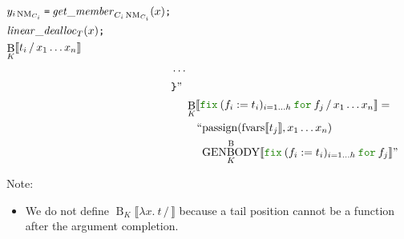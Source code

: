 \documentclass[a4paper,fleqn]{article}
\newcommand{\kwfix}{\mbox{\color{mygreen}\ttfamily fix}}
\newcommand{\kwfor}{\mbox{\color{mygreen}\ttfamily for}}
\newcommand{\lam}[2]{\lambda #1.\:#2}
\newcommand{\fix}[4]{\kwfix\:(#1 := #2)_{#3}\:\kwfor\:#4}
\DeclareMathOperator{\NM}{NM}
\newcommand{\BRA}[1]{\llbracket #1 \rrbracket}
\DeclareMathOperator{\genbody}{GENBODY}
\newcommand{\genbodyb}[2]{\genbody^\mathrm{B}_{#1}\BRA{#2}}
\newcommand{\ldq}{\text{``}}
\newcommand{\rdq}{\text{''}}
\newcommand{\ttrbrace}{\texttt{\char '175}}
\newcommand{\tteq}{\texttt{=}}
\newcommand{\ttsemi}{\texttt{;}}
\DeclareMathOperator{\passign}{passign}
\DeclareMathOperator{\fvarsop}{fvars}
\newcommand{\fvars}[1]{\fvarsop\BRA{#1}}
\DeclareMathOperator{\Bop}{B}
\newcommand{\B}[3]{\Bop_{#1}\BRA{#2\,/\,#3}}
\begin{document}
\begin{align*}
\begin{alignedat}{2}
\begin{aligned}[t]
                & y_{i\NM_{C_i}}\:\tteq\:\mathit{get\_member}_{C_i\NM_{C_i}}(x)\ttsemi \\
                & \mathit{linear\_dealloc}_{T}(x)\ttsemi \\
                & {\B{K}{t_i}{x_1\ldots x_n}}
              \end{aligned} \\
            & \cdots \\
            & \ttrbrace\rdq
     \end{alignedat} \\
  &\B{K}{\fix{f_i}{t_i}{i=1\ldots h}{f_j}}{x_1\ldots x_n} =       \\
     & \quad\begin{alignedat}{2}
       \ldq & {\passign(\fvars{t_j}, x_1\ldots x_n)} \\
            & {\genbodyb{K}{\fix{f_i}{t_i}{i=1\ldots h}{f_j}}} \rdq
       \end{alignedat}
\end{align*}
{\small Note:
\begin{itemize}
  \item We do not define $\B{K}{\lam{x}{t}}{}$ because a tail position cannot be a function after the argument completion.
\end{itemize}}
\end{document}

